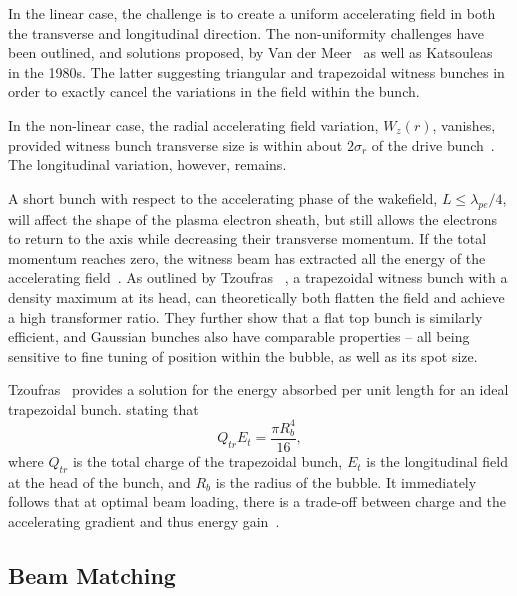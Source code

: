 
In the linear case, the challenge is to create a uniform accelerating field in both the transverse and longitudinal direction. The non-uniformity challenges have been outlined, and solutions proposed, by Van der Meer~\cite{van_der_meer:1985} as well as Katsouleas \etal~\cite{katsouleas:1987} in the 1980s. The latter suggesting triangular and trapezoidal witness bunches in order to exactly cancel the variations in the field within the bunch.

In the non-linear case, the radial accelerating field variation, $W_{z}(r)$, vanishes, provided witness bunch transverse size is within about $2\sigma_{r}$ of the drive bunch~\cite{rosenzweig:1991}. The longitudinal variation, however, remains.

A short bunch with respect to the accelerating phase of the wakefield, $L \leq \lambda_{pe}/4$, will affect the shape of the plasma electron sheath, but still allows the electrons to return to the axis while decreasing their transverse momentum. If the total momentum reaches zero, the witness beam has extracted all the energy of the accelerating field~\cite{lu:2006a,lu:2006}. As outlined by Tzoufras \etal~\cite{tzoufras:2009}, a trapezoidal witness bunch with a density maximum at its head, can theoretically both flatten the field and achieve a high transformer ratio. They further show that a flat top bunch is similarly efficient, and Gaussian bunches also have comparable properties -- all being sensitive to fine tuning of position within the bubble, as well as its spot size.

Tzoufras \etal ~provides a solution for the energy absorbed per unit length for an ideal trapezoidal bunch. stating that
\begin{equation}
    Q_{tr}E_{t} = \frac{\pi R_{b}^{4}}{16}, \label{EQ:Trapez}
\end{equation}
where $Q_{tr}$ is the total charge of the trapezoidal bunch, $E_{t}$ is the longitudinal field at the head of the bunch, and $R_{b}$ is the radius of the bubble. It immediately follows that at optimal beam loading, there is a trade-off between charge and the accelerating gradient and thus energy gain~\cite{tzoufras:2009}.

\subsection{Beam Matching}
\label{Int:BPI:Match}

